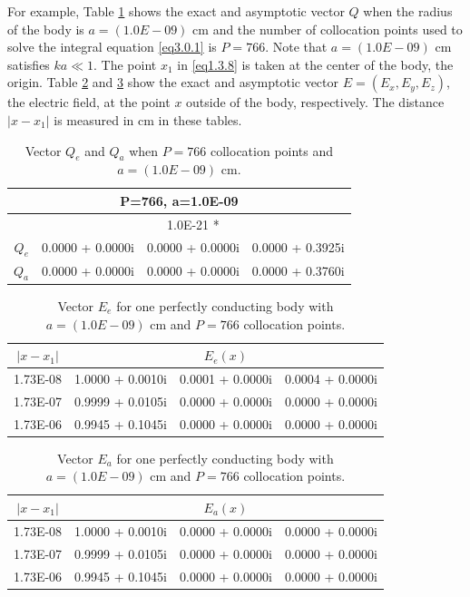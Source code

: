 \documentclass[12pt]{article}
\numberwithin{equation}{section}
\begin{document}
For example, Table \ref{tab3.1.2.0} shows the exact and asymptotic vector $Q$ when the radius of the body is $a=(1.0E-09)$ cm and the number of collocation points used to solve the integral equation \eqref{eq3.0.1} is $P=766$. Note that $a=(1.0E-09)$ cm satisfies $ka \ll 1$. The point $x_1$ in \eqref{eq1.3.8} is taken at the center of the body, the origin. Table \ref{tab3.1.2.1} and \ref{tab3.1.2.2} show the exact and asymptotic vector $E=(E_x,E_y,E_z)$, the electric field, at the point $x$ outside of the body, respectively. The distance $|x-x_1|$ is measured in cm in these tables.

\begin{table}[htbp]
  \centering
  \caption{Vector $Q_e$ and $Q_a$ when $P=766$ collocation points and $a=(1.0E-09)$ cm.}
    \begin{tabular}{rccc}
    \toprule
    \multicolumn{4}{c}{P=766, a=1.0E-09} \\
    \midrule
    \multicolumn{1}{c}{} & \multicolumn{3}{c}{ 1.0E-21 *} \\
    $Q_e$  & 0.0000 + 0.0000i & 0.0000 + 0.0000i & 0.0000 + 0.3925i \\
    $Q_a$  & 0.0000 + 0.0000i & 0.0000 + 0.0000i & 0.0000 + 0.3760i \\
    \bottomrule
    \end{tabular}%
  \label{tab3.1.2.0}%
\end{table}%
\begin{table}[htbp]
  \centering
  \caption{Vector $E_e$ for one perfectly conducting body with $a=(1.0E-09)$ cm and $P=766$ collocation points.}
    \begin{tabular}{crrr}
    \toprule
    $|x-x_1|$ & \multicolumn{3}{c}{$E_{e}(x)$} \\
    \midrule
	1.73E-08 & 1.0000 + 0.0010i & 0.0001 + 0.0000i & 0.0004 + 0.0000i \\
    1.73E-07 & 0.9999 + 0.0105i & 0.0000 + 0.0000i & 0.0000 + 0.0000i \\
    1.73E-06 & 0.9945 + 0.1045i & 0.0000 + 0.0000i & 0.0000 + 0.0000i \\	
    \bottomrule
    \end{tabular}%
  \label{tab3.1.2.1}%
\end{table}%
\begin{table}[htbp]
  \centering
  \caption{Vector $E_a$ for one perfectly conducting body with $a=(1.0E-09)$ cm and $P=766$ collocation points.}
    \begin{tabular}{crrr}
    \toprule
    $|x-x_1|$ & \multicolumn{3}{c}{$E_{a}(x)$} \\
    \midrule
	1.73E-08 & 1.0000 + 0.0010i & 0.0000 + 0.0000i & 0.0000 + 0.0000i \\
    1.73E-07 & 0.9999 + 0.0105i & 0.0000 + 0.0000i & 0.0000 + 0.0000i \\
    1.73E-06 & 0.9945 + 0.1045i & 0.0000 + 0.0000i & 0.0000 + 0.0000i \\
    \bottomrule
    \end{tabular}%
  \label{tab3.1.2.2}%
\end{table}%
\end{document}
